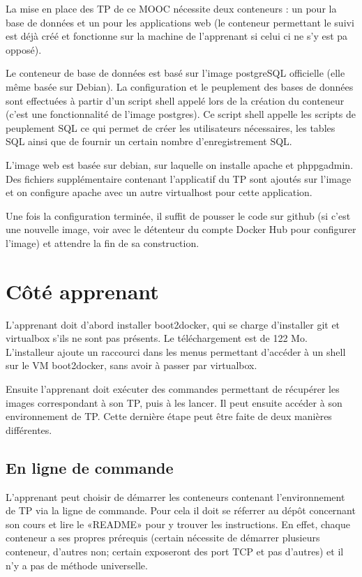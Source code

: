 \documentclass[a4paper,11pt]{report}
\begin{document}
La mise en place des TP de ce MOOC nécessite deux conteneurs : un pour la base de données et un pour les applications web (le conteneur permettant le suivi est déjà créé et fonctionne sur la machine de l'apprenant si celui ci ne s'y est pa opposé).

Le conteneur de base de données est basé sur l'image postgreSQL officielle (elle même basée sur Debian). La configuration et le peuplement des bases de données sont effectuées à partir d'un script shell appelé lors de la création du conteneur (c'est une fonctionnalité de l'image postgres). Ce script shell appelle les scripts de peuplement SQL ce qui permet de créer les utilisateurs nécessaires, les tables SQL ainsi que de fournir un certain nombre d'enregistrement SQL.

L'image web est basée sur debian, sur laquelle on installe apache et phppgadmin. Des fichiers supplémentaire contenant l'applicatif du TP sont ajoutés sur l'image et on configure apache avec un autre virtualhost pour cette application.

Une fois la configuration terminée, il suffit de pousser le code sur github (si c'est une nouvelle image, voir avec le détenteur du compte Docker Hub pour configurer l'image) et attendre la fin de sa construction.

\section{Côté apprenant}

L'apprenant doit d'abord installer boot2docker, qui se charge d'installer git et virtualbox s'ils ne sont pas présents. Le téléchargement est de 122 Mo. L'installeur ajoute un raccourci dans les menus permettant d'accéder à un shell sur le VM boot2docker, sans avoir à passer par virtualbox. 

Ensuite l'apprenant doit exécuter des commandes permettant de récupérer les images correspondant à son TP, puis à les lancer. Il peut ensuite accéder à son environnement de TP. Cette dernière étape peut être faite de deux manières différentes.

\subsection{En ligne de commande}

L'apprenant peut choisir de démarrer les conteneurs contenant l'environnement de TP via la ligne de commande. Pour cela il doit se réferrer au dépôt concernant son cours et lire le «README» pour y trouver les instructions. En effet, chaque conteneur a ses propres prérequis (certain nécessite de démarrer plusieurs conteneur, d'autres non; certain exposeront des port TCP et pas d'autres) et il n'y a pas de méthode universelle.
\end{document}
